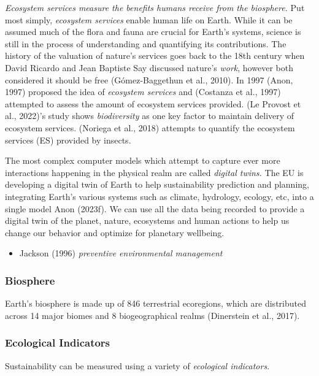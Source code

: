 \documentclass[
  letterpaper,
  DIV=11,
  numbers=noendperiod]{scrartcl}
\providecommand{\tightlist}{%
  \setlength{\itemsep}{0pt}\setlength{\parskip}{0pt}}\usepackage{longtable,booktabs,array}
\begin{document}
\emph{Ecosystem services measure the benefits humans receive from the
biosphere.} Put most simply, \emph{ecosystem services} enable human life
on Earth. While it can be assumed much of the flora and fauna are
crucial for Earth's systems, science is still in the process of
understanding and quantifying its contributions. The history of the
valuation of nature's services goes back to the 18th century when David
Ricardo and Jean Baptiste Say discussed nature's \emph{work}, however
both considered it should be free (Gómez-Baggethun et al., 2010). In
1997 (Anon, 1997) proposed the idea of \emph{ecosystem services} and
(Costanza et al., 1997) attempted to assess the amount of ecosystem
services provided. (Le Provost et al., 2022)'s study shows
\emph{biodiversity} as one key factor to maintain delivery of ecosystem
services. (Noriega et al., 2018) attempts to quantify the ecosystem
services (ES) provided by insects.

The most complex computer models which attempt to capture ever more
interactions happening in the physical realm are called \emph{digital
twins.} The EU is developing a digital twin of Earth to help
sustainability prediction and planning, integrating Earth's various
systems such as climate, hydrology, ecology, etc, into a single model
Anon (2023f). We can use all the data being recorded to provide a
digital twin of the planet, nature, ecosystems and human actions to help
us change our behavior and optimize for planetary wellbeing.

\begin{itemize}
\tightlist
\item
  Jackson (1996) \emph{preventive environmental management}
\end{itemize}

\subsubsection{Biosphere}\label{biosphere}

Earth's biosphere is made up of 846 terrestrial ecoregions, which are
distributed across 14 major biomes and 8 biogeographical realms
(Dinerstein et al., 2017).

\subsubsection{Ecological Indicators}\label{ecological-indicators}

Sustainability can be measured using a variety of \emph{ecological
indicators}.
\end{document}
